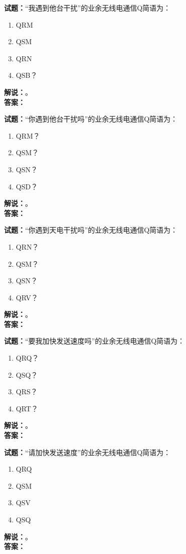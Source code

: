 \documentclass{ctexbook}
\begin{document}
\bigskip

\noindent\textbf{试题：}“我遇到他台干扰”的业余无线电通信Q简语为：
\begin{enumerate}[leftmargin=3em]
  \item QRM
  \item QSM
  \item QRN
  \item QSB？
\end{enumerate}
\noindent\textbf{解说：}\textbf{}。\\\noindent\textbf{答案：}

\bigskip

\noindent\textbf{试题：}“你遇到他台干扰吗”的业余无线电通信Q简语为：
\begin{enumerate}[leftmargin=3em]
  \item QRM？
  \item QSM？
  \item QSN？
  \item QSD？
\end{enumerate}
\noindent\textbf{解说：}\textbf{}。\\\noindent\textbf{答案：}

\bigskip

\noindent\textbf{试题：}“你遇到天电干扰吗”的业余无线电通信Q简语为：
\begin{enumerate}[leftmargin=3em]
  \item QRN？
  \item QSM？
  \item QSN？
  \item QRV？
\end{enumerate}
\noindent\textbf{解说：}\textbf{}。\\\noindent\textbf{答案：}

\bigskip

\noindent\textbf{试题：}“要我加快发送速度吗”的业余无线电通信Q简语为：
\begin{enumerate}[leftmargin=3em]
  \item QRQ？
  \item QSQ？
  \item QRS？
  \item QRT？
\end{enumerate}
\noindent\textbf{解说：}\textbf{}。\\\noindent\textbf{答案：}

\bigskip

\noindent\textbf{试题：}“请加快发送速度”的业余无线电通信Q简语为：
\begin{enumerate}[leftmargin=3em]
  \item QRQ
  \item QSM
  \item QSV
  \item QSQ
\end{enumerate}
\noindent\textbf{解说：}\textbf{}。\\\noindent\textbf{答案：}
\end{document}
